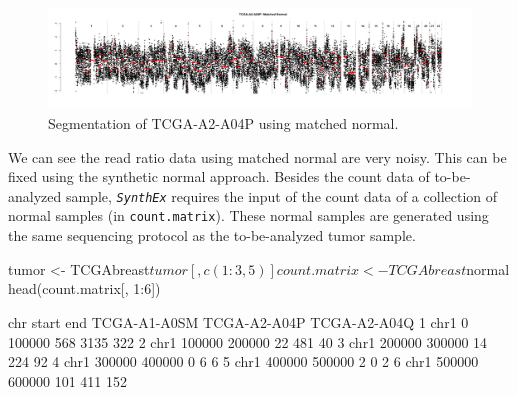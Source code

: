 \documentclass{article}
\newcommand{\pkg}[1]{\texttt{\textsl{#1}}}
\newcommand{\code}[1]{\texttt{#1}}
\begin{document}
\begin{Schunk}
\end{Schunk}

\begin{figure}
\begin{center}
\includegraphics[width=\textwidth]{figure/multiple1-1}
\end{center}
\caption{Segmentation of TCGA-A2-A04P using matched normal.}
\label{matched}
\end{figure}

We can see the read ratio data using matched normal are very noisy. This can be fixed using the synthetic normal approach. Besides the count data of to-be-analyzed sample, \pkg{SynthEx} requires the input of the count data of a collection of normal samples (in \code{count.matrix}). These normal samples are generated using the same sequencing protocol as the to-be-analyzed tumor sample.

\begin{Schunk}
\begin{Sinput}
 tumor <- TCGAbreast$tumor[, c(1:3, 5)]
 count.matrix <- TCGAbreast$normal
 head(count.matrix[, 1:6])
\end{Sinput}
\begin{Soutput}
   chr  start    end TCGA-A1-A0SM TCGA-A2-A04P TCGA-A2-A04Q
1 chr1      0 100000          568         3135          322
2 chr1 100000 200000           22          481           40
3 chr1 200000 300000           14          224           92
4 chr1 300000 400000            0            6            6
5 chr1 400000 500000            2            0            2
6 chr1 500000 600000          101          411          152
\end{Soutput}
\end{Schunk}
\end{document}
